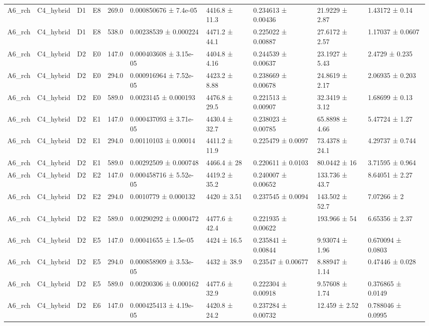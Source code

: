 \begin{table}
\begin{tabular}{llllllllll}
A6\_rch & C4\_hybrid & D1 & E8 & 269.0 & 0.000850676 ± 7.4e-05 & 4416.8 ± 11.3 & 0.234613 ± 0.00436 & 21.9229 ± 2.87 & 1.43172 ± 0.14 \\
A6\_rch & C4\_hybrid & D1 & E8 & 538.0 & 0.00238539 ± 0.000224 & 4471.2 ± 44.1 & 0.225022 ± 0.00887 & 27.6172 ± 2.57 & 1.17037 ± 0.0607 \\
A6\_rch & C4\_hybrid & D2 & E0 & 147.0 & 0.000403608 ± 3.15e-05 & 4404.8 ± 4.16 & 0.244539 ± 0.00637 & 23.1927 ± 5.43 & 2.4729 ± 0.235 \\
A6\_rch & C4\_hybrid & D2 & E0 & 294.0 & 0.000916964 ± 7.52e-05 & 4423.2 ± 8.88 & 0.238669 ± 0.00678 & 24.8619 ± 2.17 & 2.06935 ± 0.203 \\
A6\_rch & C4\_hybrid & D2 & E0 & 589.0 & 0.0023145 ± 0.000193 & 4476.8 ± 29.5 & 0.221513 ± 0.00907 & 32.3419 ± 3.12 & 1.68699 ± 0.13 \\
A6\_rch & C4\_hybrid & D2 & E1 & 147.0 & 0.000437093 ± 3.71e-05 & 4430.4 ± 32.7 & 0.238023 ± 0.00785 & 65.8898 ± 4.66 & 5.47724 ± 1.27 \\
A6\_rch & C4\_hybrid & D2 & E1 & 294.0 & 0.00110103 ± 0.00014 & 4411.2 ± 11.9 & 0.225479 ± 0.0097 & 73.4378 ± 24.1 & 4.29737 ± 0.744 \\
A6\_rch & C4\_hybrid & D2 & E1 & 589.0 & 0.00292509 ± 0.000748 & 4466.4 ± 28 & 0.220611 ± 0.0103 & 80.0442 ± 16 & 3.71595 ± 0.964 \\
A6\_rch & C4\_hybrid & D2 & E2 & 147.0 & 0.000458716 ± 5.52e-05 & 4419.2 ± 35.2 & 0.240007 ± 0.00652 & 133.736 ± 43.7 & 8.64051 ± 2.27 \\
A6\_rch & C4\_hybrid & D2 & E2 & 294.0 & 0.0010779 ± 0.000132 & 4420 ± 3.51 & 0.237545 ± 0.0094 & 143.502 ± 52.7 & 7.07266 ± 2 \\
A6\_rch & C4\_hybrid & D2 & E2 & 589.0 & 0.00290292 ± 0.000472 & 4477.6 ± 42.4 & 0.221935 ± 0.00622 & 193.966 ± 54 & 6.65356 ± 2.37 \\
A6\_rch & C4\_hybrid & D2 & E5 & 147.0 & 0.00041655 ± 1.5e-05 & 4424 ± 16.5 & 0.235841 ± 0.00844 & 9.93074 ± 1.96 & 0.670094 ± 0.0803 \\
A6\_rch & C4\_hybrid & D2 & E5 & 294.0 & 0.000858909 ± 3.53e-05 & 4432 ± 38.9 & 0.23547 ± 0.00677 & 8.88947 ± 1.14 & 0.47446 ± 0.028 \\
A6\_rch & C4\_hybrid & D2 & E5 & 589.0 & 0.00200306 ± 0.000162 & 4477.6 ± 32.9 & 0.222304 ± 0.00918 & 9.57608 ± 1.74 & 0.376865 ± 0.0149 \\
A6\_rch & C4\_hybrid & D2 & E6 & 147.0 & 0.000425413 ± 4.19e-05 & 4420.8 ± 24.2 & 0.237284 ± 0.00732 & 12.459 ± 2.52 & 0.788046 ± 0.0995 \\

\end{tabular}
\end{table}
